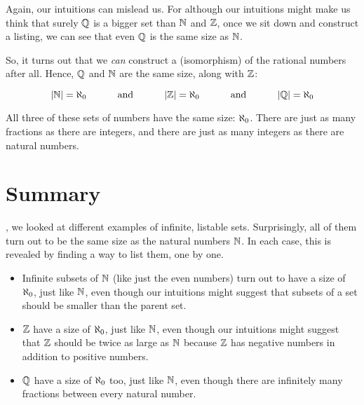 \documentclass[../../../main.tex]{subfiles}
\begin{document}
\begin{aside}
  \begin{remark}
    Again, our intuitions can mislead us. For although our intuitions might make us think that surely $\Rationals/$ is a bigger set than $\Nats/$ and $\Ints/$, once we sit down and construct a listing, we can see that even $\Rationals/$ is the same size as $\Nats/$.
  \end{remark}
\end{aside}

So, it turns out that we \emph{can} construct a  (isomorphism) of the rational numbers after all. Hence, $\Rationals/$ and $\Nats/$ are the same size, along with $\Ints/$:

\begin{equation*}
  \cardinality{\Nats/} = \AlephZero/ 
  \hskip1cm \text{ and } \hskip 1cm
  \cardinality{\Ints/} = \AlephZero/ 
  \hskip1cm \text{ and } \hskip 1cm
  \cardinality{\Rationals/} = \AlephZero/ 
\end{equation*}

All three of these sets of numbers have the same size: $\AlephZero/$. There are just as many fractions as there are integers, and there are just as many integers as there are natural numbers.


\section{Summary}

, we looked at different examples of infinite, listable sets. Surprisingly, all of them turn out to be the same size as the natural numbers $\Nats/$. In each case, this is revealed by finding a way to list them, one by one.

\begin{itemize}
  \item Infinite subsets of $\Nats/$ (like just the even numbers) turn out to have a size of $\AlephZero/$, just like $\Nats/$, even though our intuitions might suggest that subsets of a set should be smaller than the parent set.
  \item $\Ints/$ have a size of $\AlephZero/$, just like $\Nats/$, even though our intuitions might suggest that $\Ints/$ should be twice as large as $\Nats/$ because $\Ints/$ has negative numbers in addition to positive numbers.
  \item $\Rationals/$ have a size of $\AlephZero/$ too, just like $\Nats/$, even though there are infinitely many fractions between every natural number. 
\end{itemize}
\end{document}
